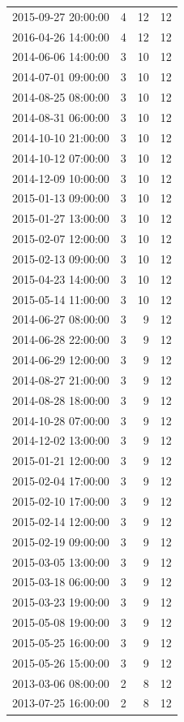 \begin{tabular}{lrrr}
2015-09-27 20:00:00 & 4 & 12 & 12 \\
2016-04-26 14:00:00 & 4 & 12 & 12 \\
2014-06-06 14:00:00 & 3 & 10 & 12 \\
2014-07-01 09:00:00 & 3 & 10 & 12 \\
2014-08-25 08:00:00 & 3 & 10 & 12 \\
2014-08-31 06:00:00 & 3 & 10 & 12 \\
2014-10-10 21:00:00 & 3 & 10 & 12 \\
2014-10-12 07:00:00 & 3 & 10 & 12 \\
2014-12-09 10:00:00 & 3 & 10 & 12 \\
2015-01-13 09:00:00 & 3 & 10 & 12 \\
2015-01-27 13:00:00 & 3 & 10 & 12 \\
2015-02-07 12:00:00 & 3 & 10 & 12 \\
2015-02-13 09:00:00 & 3 & 10 & 12 \\
2015-04-23 14:00:00 & 3 & 10 & 12 \\
2015-05-14 11:00:00 & 3 & 10 & 12 \\
2014-06-27 08:00:00 & 3 & 9 & 12 \\
2014-06-28 22:00:00 & 3 & 9 & 12 \\
2014-06-29 12:00:00 & 3 & 9 & 12 \\
2014-08-27 21:00:00 & 3 & 9 & 12 \\
2014-08-28 18:00:00 & 3 & 9 & 12 \\
2014-10-28 07:00:00 & 3 & 9 & 12 \\
2014-12-02 13:00:00 & 3 & 9 & 12 \\
2015-01-21 12:00:00 & 3 & 9 & 12 \\
2015-02-04 17:00:00 & 3 & 9 & 12 \\
2015-02-10 17:00:00 & 3 & 9 & 12 \\
2015-02-14 12:00:00 & 3 & 9 & 12 \\
2015-02-19 09:00:00 & 3 & 9 & 12 \\
2015-03-05 13:00:00 & 3 & 9 & 12 \\
2015-03-18 06:00:00 & 3 & 9 & 12 \\
2015-03-23 19:00:00 & 3 & 9 & 12 \\
2015-05-08 19:00:00 & 3 & 9 & 12 \\
2015-05-25 16:00:00 & 3 & 9 & 12 \\
2015-05-26 15:00:00 & 3 & 9 & 12 \\
2013-03-06 08:00:00 & 2 & 8 & 12 \\
2013-07-25 16:00:00 & 2 & 8 & 12 \\

\end{tabular}
